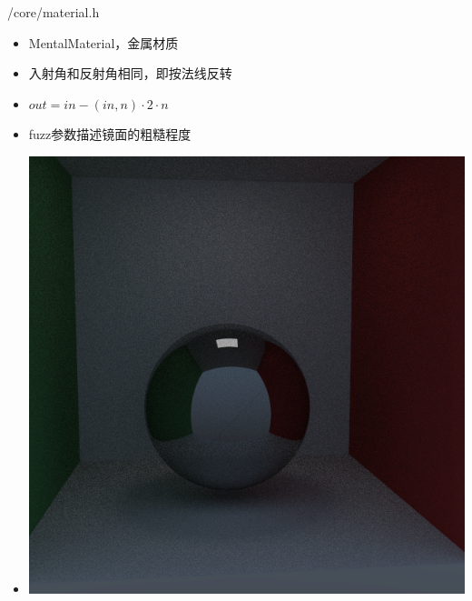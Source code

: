 \documentclass{beamer}
\begin{document}
\begin{frame} {/core/material.h}
\begin{itemize}
\item MentalMaterial，金属材质
\item 入射角和反射角相同，即按法线反转
\item $out=in - (in,n) \cdot 2 \cdot n $
\item fuzz参数描述镜面的粗糙程度
\item \includegraphics[scale=0.2]{mental}
\end{itemize}
\end{frame}
\end{document}
